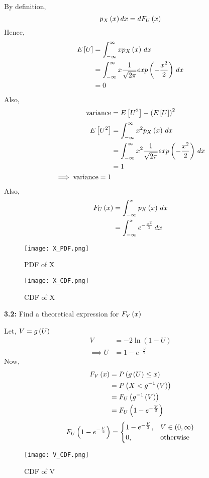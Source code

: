 \documentclass[journal,12pt,two column]{IEEEtran}
\begin{document}
\solution
By definition,
\begin{equation}
    p_{X}\left(x\right)dx = dF_{U}\left(x\right)
\end{equation}
Hence,
\begin{align}
    E{}\left[U\right] &= \int_{-\infty}^{\infty} x p_{X}\left(x\right) \,dx \\
               &= \int_{-\infty}^{\infty} x \frac{1}{\sqrt{2\pi}}exp\left(-\frac{x^2}{2}\right) \,dx \\
               &= 0
\end{align}
Also,
\begin{equation}
    \text{variance} = E{}\left[U^2\right] - \left(E{}\left[U\right]\right)^2
\end{equation}
\begin{align}
   E{}\left[U^2\right] &=  \int_{-\infty}^{\infty} x^2 p_{X}\left(x\right) \,dx \\
                &= \int_{-\infty}^{\infty} x^2 \frac{1}{\sqrt{2\pi}}exp\left(-\frac{x^2}{2}\right) \,dx \\
                &= 1 \\
    \implies \text{variance} = 1
\end{align}
Also,
\begin{align}
   F_{U}\left(x\right) &=  \int_{-\infty}^{x} p_{X}\left(x\right) \,dx  \\
                 &= \int_{-\infty}^{x} e^{-\frac{x^2}{2}}\,dx 
\end{align}
\begin{figure}[!ht]
\texttt{[image: X\_PDF.png]}
\caption{PDF of X}
\label{Fig 2}
\end{figure}  
\begin{figure}[!ht]
\texttt{[image: X\_CDF.png]}
\caption{CDF of X}
\label{Fig 3}
\end{figure}  


\textbf{3.2:} Find a theoretical expression for $F_V\left(x\right)$

\solution
Let, $V = g\left(U\right)$
\begin{align}
    V &= -2\ln{(1 - U)} \\
    \implies U &= 1 - e^{-\frac{V}{2}}
\end{align}
Now, 
\begin{align}
    F_{V}\left(x\right) &= P\left(g\left(U\right)\leq x\right) \\
                  &= P\left(X < g^{-1}\left(V\right)\right) \\
                  &= F_{U}\left(g^{-1}\left(V\right)\right) \\
                  &= F_{U}\left(1 - e^{-\frac{V}{2}}\right)
\end{align}
\begin{align}  
F_{U}\left(1 - e^{-\frac{V}{2}}\right) = 
\begin{cases}
1 - e^{-\frac{V}{2}}, & V \in (0,\infty) \\
0, & \text{otherwise}
\end{cases}
\end{align}
\begin{figure}[!ht]
\texttt{[image: V\_CDF.png]}
\caption{CDF of V}
\label{Fig 4}
\end{figure}   
\end{document}

